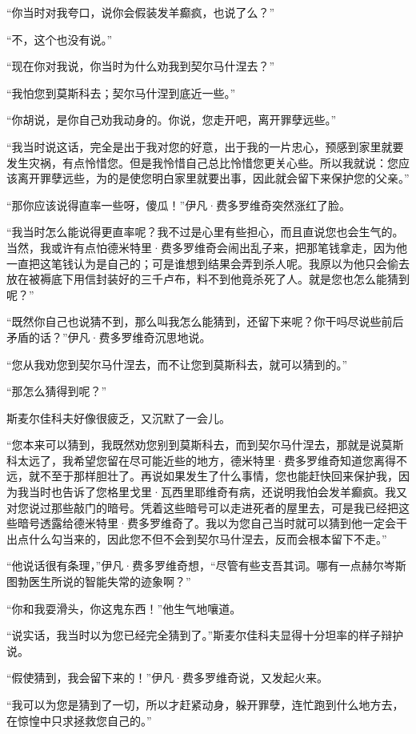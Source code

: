 \par “你当时对我夸口，说你会假装发羊癫疯，也说了么？”
\par “不，这个也没有说。”
\par “现在你对我说，你当时为什么劝我到契尔马什涅去？”
\par “我怕您到莫斯科去；契尔马什涅到底近一些。”
\par “你胡说，是你自己劝我动身的。你说，您走开吧，离开罪孽远些。”
\par “我当时说这话，完全是出于我对您的好意，出于我的一片忠心，预感到家里就要发生灾祸，有点怜惜您。但是我怜惜自己总比怜惜您更关心些。所以我就说：您应该离开罪孽远些，为的是使您明白家里就要出事，因此就会留下来保护您的父亲。”
\par “那你应该说得直率一些呀，傻瓜！”伊凡·费多罗维奇突然涨红了脸。
\par “我当时怎么能说得更直率呢？我不过是心里有些担心，而且直说您也会生气的。当然，我或许有点怕德米特里·费多罗维奇会闹出乱子来，把那笔钱拿走，因为他一直把这笔钱认为是自己的；可是谁想到结果会弄到杀人呢。我原以为他只会偷去放在被褥底下用信封装好的三千卢布，料不到他竟杀死了人。就是您也怎么能猜到呢？”
\par “既然你自己也说猜不到，那么叫我怎么能猜到，还留下来呢？你干吗尽说些前后矛盾的话？”伊凡·费多罗维奇沉思地说。
\par “您从我劝您到契尔马什涅去，而不让您到莫斯科去，就可以猜到的。”
\par “那怎么猜得到呢？”
\par 斯麦尔佳科夫好像很疲乏，又沉默了一会儿。
\par “您本来可以猜到，我既然劝您别到莫斯科去，而到契尔马什涅去，那就是说莫斯科太远了，我希望您留在尽可能近些的地方，德米特里·费多罗维奇知道您离得不远，就不至于那样胆壮了。再说如果发生了什么事情，您也能赶快回来保护我，因为我当时也告诉了您格里戈里·瓦西里耶维奇有病，还说明我怕会发羊癫疯。我又对您说过那些敲门的暗号。凭着这些暗号可以走进死者的屋里去，可是我已经把这些暗号透露给德米特里·费多罗维奇了。我以为您自己当时就可以猜到他一定会干出点什么勾当来的，因此您不但不会到契尔马什涅去，反而会根本留下不走。”
\par “他说话很有条理，”伊凡·费多罗维奇想，“尽管有些支吾其词。哪有一点赫尔岑斯图勃医生所说的智能失常的迹象啊？”
\par “你和我耍滑头，你这鬼东西！”他生气地嚷道。
\par “说实话，我当时以为您已经完全猜到了。”斯麦尔佳科夫显得十分坦率的样子辩护说。
\par “假使猜到，我会留下来的！”伊凡·费多罗维奇说，又发起火来。
\par “我可以为您是猜到了一切，所以才赶紧动身，躲开罪孽，连忙跑到什么地方去，在惊惶中只求拯救您自己的。”
